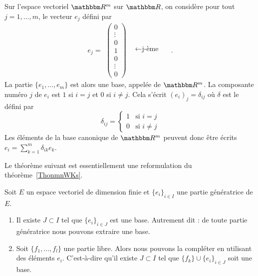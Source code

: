\begin{example}
    Sur l'espace vectoriel \( \eR^m\) sur \( \eR \), on considère pour tout $j = 1,\dots, m$, le vecteur $e_j$ défini par
    \begin{equation}\nonumber
      e_j=
    \begin{array}{cc}
      \begin{pmatrix}
        0\\\vdots\\0\\1\\ 0\\\vdots\\0
      \end{pmatrix} &
      \begin{matrix}
        \quad\\\quad\\\leftarrow\textrm{j-ème} \quad\\\quad\\\quad\\
      \end{matrix}
    \end{array}.
    \end{equation}
    La partie $\{e_1,\ldots, e_m\}$ est alors une base, appelée  de \( \eR^m\).
    La composante numéro $j$ de $e_i$ est $1$ si $i=j$ et $0$ si $i\neq j$. Cela s'écrit $(e_i)_j=\delta_{ij}$ où $\delta$ est le  défini par
    \begin{equation}
        \delta_{ij}=\begin{cases}
            1	&	\text{si }i=j\\
            0	&	 \text{si }i\neq j
        \end{cases}
    \end{equation}
    Les éléments de la base canonique de $\eR^m$ peuvent donc être écrits $e_i=\sum_{k=1}^m\delta_{ik}e_k$.
\end{example}

Le théorème suivant est essentiellement une reformulation du théorème~\ref{ThonmnWKs}.
\begin{theorem} \label{ThoMGQZooIgrXjy}
    Soit \( E\) un espace vectoriel de dimension finie et \( \{ e_i \}_{i\in I}\) une partie génératrice de \( E\).

    \begin{enumerate}
        \item       \label{ITEMooTZUDooFEgymQ}
            Il existe \( J\subset I\) tel que \( \{ e_i \}_{i\in J}\) est une base. Autrement dit : de toute partie génératrice nous pouvons extraire une base.
        \item       \label{ITEMooCJQGooXwjsfm}
            Soit \( \{ f_1,\ldots, f_l \}\) une partie libre. Alors nous pouvons la compléter en utilisant des éléments \( e_i\). C'est-à-dire qu'il existe \( J\subset I\) tel que \( \{ f_k \}\cup\{ e_i \}_{i\in J}\) soit une base.
    \end{enumerate}
\end{theorem}

